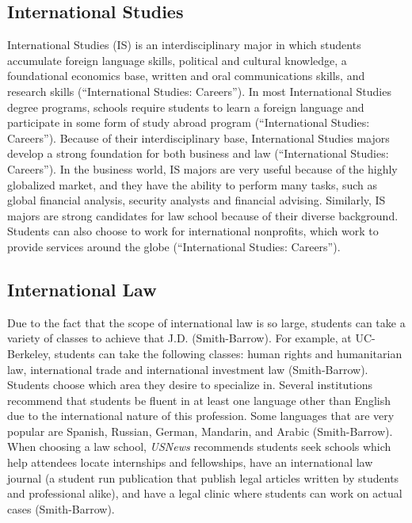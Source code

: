 \begin{multicols}{2}
    \subsection{International Studies}
        International Studies (IS) is an interdisciplinary major in which students accumulate foreign language skills, political and cultural knowledge, a foundational economics base, written and oral communications skills, and research skills (“International Studies: Careers”). In most International Studies degree programs, schools require students to learn a foreign language and participate in some form of study abroad program (“International Studies: Careers”). Because of their interdisciplinary base, International Studies majors develop a strong foundation for both business and law (“International Studies: Careers”). In the business world, IS majors are very useful because of the highly globalized market, and they have the ability to perform many tasks, such as global financial analysis, security analysts and financial advising. Similarly, IS majors are strong candidates for law school because of their diverse background. Students can also choose to work for international nonprofits, which work to provide services around the globe (“International Studies: Careers”). 
    \subsection{International Law}
        Due to the fact that the scope of international law is so large, students can take a variety of classes to achieve that J.D. (Smith-Barrow). For example, at UC-Berkeley, students can take the following classes: human rights and humanitarian law, international trade and international investment law (Smith-Barrow). Students choose which area they desire to specialize in. Several institutions recommend that students be fluent in at least one language other than English due to the international nature of this profession. Some languages that are very popular are Spanish, Russian, German, Mandarin, and Arabic (Smith-Barrow). When choosing a law school, \textit{USNews} recommends students seek schools which help attendees locate internships and fellowships, have an international law journal (a student run publication that publish legal articles written by students and professional alike), and have a legal clinic where students can work on actual cases (Smith-Barrow). 


\end{multicols}
